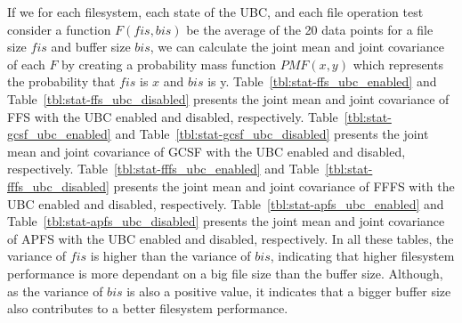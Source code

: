 If we for each filesystem, each state of the \gls{UBC}, and each file operation test consider a function $F(fis, bis)$ be the average of the 20 data points for a file size $fis$ and buffer size $bis$, we can calculate the joint mean and joint covariance of each $F$ by creating a probability mass function $PMF(x, y)$ which represents the probability that $fis$ is $x$ and $bis$ is y. Table~\ref{tbl:stat-ffs_ubc_enabled} and Table~\ref{tbl:stat-ffs_ubc_disabled} presents the joint mean and joint covariance of \gls{FFS} with the \gls{UBC} enabled and disabled, respectively. Table~\ref{tbl:stat-gcsf_ubc_enabled} and Table~\ref{tbl:stat-gcsf_ubc_disabled} presents the joint mean and joint covariance of \gls{GCSF} with the \gls{UBC} enabled and disabled, respectively. Table~\ref{tbl:stat-fffs_ubc_enabled} and Table~\ref{tbl:stat-fffs_ubc_disabled} presents the joint mean and joint covariance of \gls{FFFS} with the \gls{UBC} enabled and disabled, respectively. Table~\ref{tbl:stat-apfs_ubc_enabled} and Table~\ref{tbl:stat-apfs_ubc_disabled} presents the joint mean and joint covariance of \gls{APFS} with the \gls{UBC} enabled and disabled, respectively. In all these tables, the variance of $fis$ is higher than the variance of $bis$, indicating that higher filesystem performance is more dependant on a big file size than the buffer size. Although, as the variance of $bis$ is also a positive value, it indicates that a bigger buffer size also contributes to a better filesystem performance.


\FloatBarrier

\FloatBarrier



\FloatBarrier

\FloatBarrier



\FloatBarrier

\FloatBarrier



\FloatBarrier

\FloatBarrier